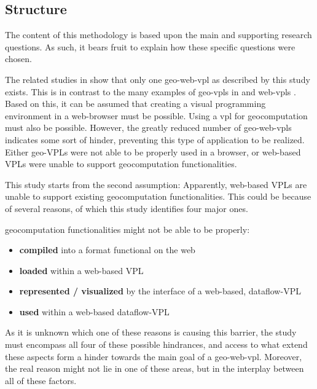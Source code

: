 \newpage

\subsection*{Structure}
  
The content of this methodology is based upon the main and supporting research questions. 
As such, it bears fruit to explain how these specific questions were chosen.

The related studies in  show that only one \ac{geo-web-vpl} as described by this study exists. This is in contrast to the many examples of geo-vpls in  and web-vpls . 
Based on this, it can be assumed that creating a visual programming environment in a web-browser must be possible. 
Using a \ac*{vpl} for geocomputation must also be possible. 
However, the greatly reduced number of geo-web-vpls indicates some sort of hinder, preventing this type of application to be realized. Either geo-VPLs were not able to be properly used in a browser, or web-based VPLs were unable to support geocomputation functionalities. 

This study starts from the second assumption: 
Apparently, web-based VPLs are unable to support existing geocomputation functionalities. 
This could be because of several reasons, of which this study identifies four major ones.

geocomputation functionalities might not be able to be properly:
\begin{itemize}[-]
  \item \textbf{compiled} into a format functional on the web
  \item \textbf{loaded} within a web-based VPL
  \item \textbf{represented / visualized} by the interface of a web-based, dataflow-VPL
  \item \textbf{used} within a web-based dataflow-VPL
\end{itemize}
As it is unknown which one of these reasons is causing this barrier, the study must encompass all four of these possible hindrances, and access to what extend these aspects form a hinder towards the main goal of a \ac{geo-web-vpl}. 
Moreover, the real reason might not lie in one of these areas, but in the interplay between all of these factors. 

